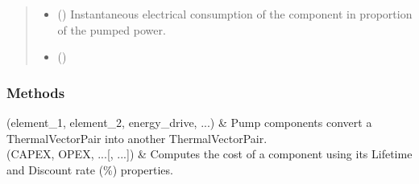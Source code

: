 \documentclass[letterpaper,10pt,english]{sphinxmanual}
\begin{document}
\begin{fulllineitems}
\begin{fulllineitems}
\begin{quote}
\begin{description}
\begin{itemize}
\begin{itemize}
\begin{description}
\end{description}

\end{itemize}


\item {} 
\sphinxAtStartPar
{} (\sphinxstyleliteralemphasis{\sphinxupquote{, }}\sphinxstyleliteralemphasis{\sphinxupquote{, }}\sphinxstyleliteralemphasis{\sphinxupquote{, }}) \textendash{} Instantaneous electrical consumption of the component in proportion of the pumped power.

\item {} 
\sphinxAtStartPar
{} (\sphinxstyleliteralemphasis{\sphinxupquote{, }}) \textendash{} 

\end{itemize}

\end{description}\end{quote}

\end{fulllineitems}

\subsubsection*{Methods}


\begin{savenotes}\sphinxattablestart
\centering
\begin{tabulary}{\linewidth}[t]{}
\hline

\sphinxAtStartPar
{\hyperref[\detokenize{generated/tamos.production.Pump:tamos.production.Pump.__init__}]{}}(element\_1, element\_2, energy\_drive, ...)
&
\sphinxAtStartPar
Pump components convert a ThermalVectorPair into another ThermalVectorPair.
\\
\hline
\sphinxAtStartPar
{\hyperref[\detokenize{generated/tamos.production.Pump:tamos.production.Pump.compute_actualized_cost}]{}}(CAPEX, OPEX, ...{[}, ...{]})
&
\sphinxAtStartPar
Computes the cost of a component using its \textquotesingle{}Lifetime\textquotesingle{} and \textquotesingle{}Discount rate (\%)\textquotesingle{} properties.
\\
\hline
\end{tabulary}
\par
\sphinxattableend\end{savenotes}

\end{fulllineitems}
\end{document}
